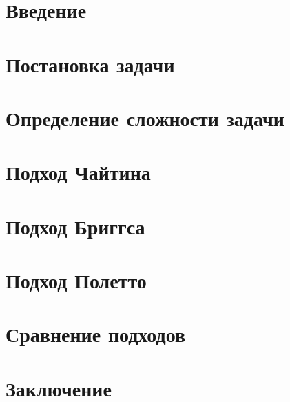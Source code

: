 



\section{Введение}



\section{Постановка задачи}



\section{Определение сложности задачи} %

\label{seg:complexity}



\section{Подход Чайтина}



\section{Подход Бриггса}



\section{Подход Полетто}



\section{Сравнение подходов}



\section{Заключение}



{}




